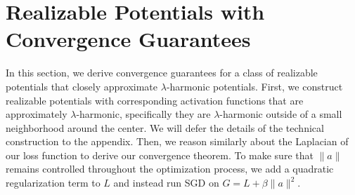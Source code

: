 
\section{Realizable Potentials with Convergence Guarantees}

In this section, we derive convergence guarantees for a class of realizable potentials that closely approximate $\lambda$-harmonic potentials. First, we construct realizable potentials with corresponding activation functions that are approximately $\lambda$-harmonic, specifically they are $\lambda$-harmonic outside of a small neighborhood around the center. We will defer the details of the technical construction to the appendix. Then, we reason similarly about the Laplacian of our loss function to derive our convergence theorem. To make sure that $\|a\|$ remains controlled throughout the optimization process, we add a quadratic regularization term to $L$ and instead run SGD on $G = L + \beta\|a\|^2$. 


